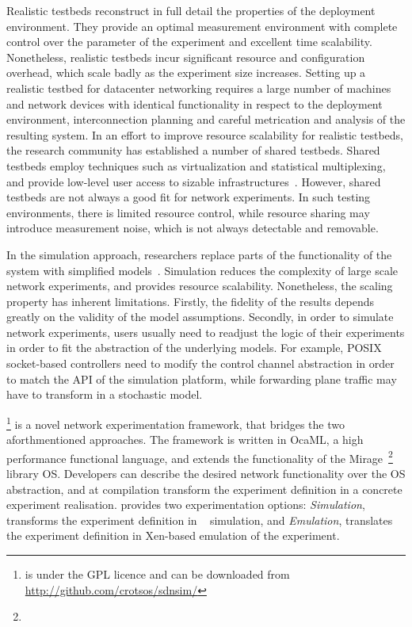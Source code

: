 Realistic testbeds reconstruct in full detail the properties of the deployment
environment. They provide an optimal measurement environment with complete
control over the parameter of the experiment and excellent time scalability.
Nonetheless, realistic testbeds incur significant resource and configuration
overhead, which scale badly as the experiment size increases.  Setting up a
realistic testbed for datacenter networking requires a large number of machines
and network devices with identical functionality in respect to the deployment
environment, interconnection planning and careful metrication and analysis of
the resulting system. In an effort to improve resource scalability for realistic
testbeds, the research community has established a number of shared
testbeds. Shared testbeds employ techniques such as virtualization and statistical
multiplexing, and provide low-level user access to sizable
infrastructures~\cite{planetlab,emulab}.  However, shared testbeds are not
always a good fit for network experiments. In such testing environments, 
there is limited resource control, while resource sharing may introduce
measurement noise, which is not always detectable and removable. 

In the simulation approach, researchers replace parts of the functionality of
the system with simplified models~\cite{Varga2008,issariyakul2012}.  
Simulation reduces the complexity of large scale
network experiments, and provides resource scalability. Nonetheless, the scaling
property has inherent limitations. Firstly, the fidelity of the
results depends greatly on the validity of the model assumptions. Secondly, in
order to simulate network experiments, users usually need to readjust the logic
of their experiments in order to fit the abstraction of the underlying models.
For example, POSIX socket-based controllers need to modify the control channel
abstraction in order to match the API of the simulation platform,
while forwarding plane traffic may have to transform in a stochastic model. 

\sdnsim\footnote{\sdnsim is under the GPL licence and can be downloaded from
  \url{http://github.com/crotsos/sdnsim/}} is a novel network experimentation
framework, that bridges the two aforthmentioned approaches. The framework is
written in OcaML, a high performance functional language, and extends the
functionality of the Mirage~\footnote{\mirageurl} library OS. Developers can
describe the desired network functionality over the \mirage OS abstraction, and
at compilation transform the experiment definition in a concrete experiment realisation.
\sdnsim provides two experimentation options: \emph{Simulation}, transforms
the experiment definition in ~\cite{Henderson2006} simulation, and \emph{Emulation},
translates the experiment definition in Xen-based emulation of the experiment.

